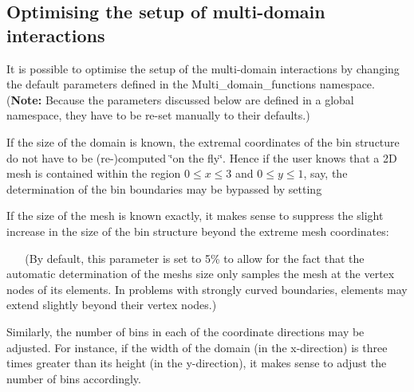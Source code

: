 \hypertarget{index_optim}{}\subsection{Optimising the setup of multi-\/domain interactions}\label{index_optim}
It is possible to optimise the setup of the multi-\/domain interactions by changing the default parameters defined in the {\ttfamily Multi\+\_\+domain\+\_\+functions} namespace. ({\bfseries Note\+:} Because the parameters discussed below are defined in a global namespace, they have to be re-\/set manually to their defaults.)
\begin{DoxyItemize}
\item If the size of the domain is known, the extremal coordinates of the bin structure do not have to be (re-\/)computed \char`\"{}on the fly\char`\"{}. Hence if the user knows that a 2D mesh is contained within the region $ 0 \le x \le 3 $ and $ 0 \le y \le 1 $, say, the determination of the bin boundaries may be bypassed by setting ~\newline
~\newline
  
\begin{DoxyCodeInclude}

\end{DoxyCodeInclude}
 If the size of the mesh is known exactly, it makes sense to suppress the slight increase in the size of the bin structure beyond the extreme mesh coordinates\+: ~\newline
~\newline
 
\begin{DoxyCodeInclude}

\end{DoxyCodeInclude}
 ~\newline
~\newline
 (By default, this parameter is set to 5\% to allow for the fact that the automatic determination of the mesh\textquotesingle{}s size only samples the mesh at the vertex nodes of its elements. In problems with strongly curved boundaries, elements may extend slightly beyond their vertex nodes.) ~\newline
~\newline

\item Similarly, the number of bins in each of the coordinate directions may be adjusted. For instance, if the width of the domain (in the x-\/direction) is three times greater than its height (in the y-\/direction), it makes sense to adjust the number of bins accordingly. ~\newline
~\newline
  

\end{DoxyItemize}
